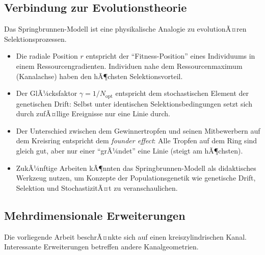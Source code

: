 ﻿\documentclass[a4paper,12pt]{article}
\theoremstyle{definition}
\begin{document}
\subsection{Verbindung zur Evolutionstheorie}

Das Springbrunnen-Modell ist eine physikalische Analogie zu evolutionÃ¤ren Selektionsprozessen.

\begin{itemize}
    \item Die radiale Position $r$ entspricht der ``Fitness-Position'' eines Individuums
          in einem Ressourcengradienten. Individuen nahe dem Ressourcenmaximum (Kanalachse)
          haben den hÃ¶chsten Selektionsvorteil.
    \item Der GlÃ¼cksfaktor $\gamma = 1/N_{\text{opt}}$ entspricht dem stochastischen
          Element der genetischen Drift: Selbst unter identischen Selektionsbedingungen
          setzt sich durch zufÃ¤llige Ereignisse nur eine Linie durch.
    \item Der Unterschied zwischen dem Gewinnertropfen und seinen Mitbewerbern auf
          dem Kreisring entspricht dem \emph{founder effect}: Alle Tropfen auf dem Ring
          sind gleich gut, aber nur einer ``grÃ¼ndet'' eine Linie (steigt am hÃ¶chsten).
    \item ZukÃ¼nftige Arbeiten kÃ¶nnten das Springbrunnen-Modell als didaktisches Werkzeug
          nutzen, um Konzepte der Populationsgenetik wie genetische Drift, Selektion und
          StochastizitÃ¤t zu veranschaulichen.
\end{itemize}

\subsection{Mehrdimensionale Erweiterungen}

Die vorliegende Arbeit beschrÃ¤nkte sich auf einen kreiszylindrischen Kanal.
Interessante Erweiterungen betreffen andere Kanalgeometrien.
\end{document}
